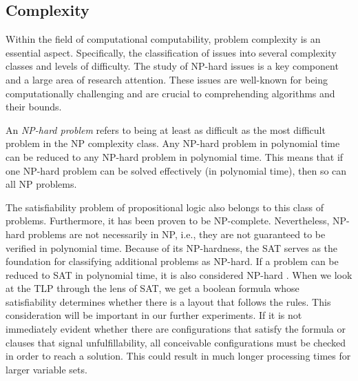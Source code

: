 \documentclass[bachelor, english]{algothesis}
\begin{document}
\subsection{Complexity}
Within the field of computational computability, problem complexity is an essential aspect. Specifically, the classification of issues into several complexity classes and levels of difficulty. The study of NP-hard issues is a key component and a large area of research attention. These issues are well-known for being computationally challenging and are crucial to comprehending algorithms and their bounds.

\begin{definition}
    An \emph{NP-hard problem} refers to being at least as difficult as the most difficult problem in the NP complexity class. Any NP-hard problem in polynomial time can be reduced to any NP-hard problem in polynomial time. This means that if one NP-hard problem can be solved effectively (in polynomial time), then so can all NP problems.
\end{definition}
\noindent
The satisfiability problem of propositional logic also belongs to this class of problems. Furthermore, it has been proven to be NP-complete. Nevertheless, NP-hard problems are not necessarily in NP, i.e., they are not guaranteed to be verified in polynomial time. Because of its NP-hardness, the SAT serves as the foundation for classifying additional problems as NP-hard. If a problem can be reduced to SAT in polynomial time, it is also considered NP-hard \cite{SAT_Complexity}. \newline
When we look at the TLP through the lens of SAT, we get a boolean formula whose satisfiability determines whether there is a layout that follows the rules. This consideration will be important in our further experiments. If it is not immediately evident whether there are configurations that satisfy the formula or clauses that signal unfulfillability, all conceivable configurations must be checked in order to reach a solution. This could result in much longer processing times for larger variable sets.
\end{document}
